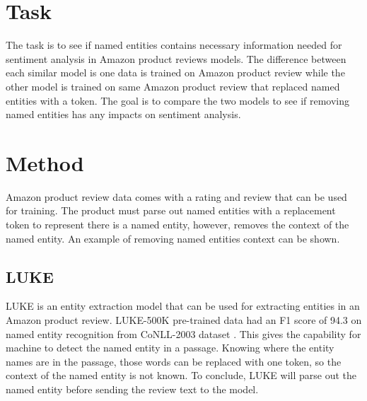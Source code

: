\documentclass[11pt,a4paper]{article}
\begin{document}
\section{Task}

The task is to see if named entities contains necessary information needed for sentiment analysis in Amazon product reviews models. The difference between each similar model is one data is trained on Amazon product review while the other model is trained on same Amazon product review that replaced named entities with a token. The goal is to compare the two models to see if removing named entities has any impacts on sentiment analysis.

\section{Method}

Amazon product review data comes with a rating and review that can be used for training. The product must parse out named entities with a replacement token to represent there is a named entity, however, removes the context of the named entity. An example of removing named entities context can be shown.



\subsection{LUKE}

LUKE is an entity extraction model that can be used for extracting entities in an Amazon product review. LUKE-500K pre-trained data had an F1 score of 94.3 on named entity recognition from CoNLL-2003 dataset \cite{yamada-etal-2020-luke}. This gives the capability for machine to detect the named entity in a passage. Knowing where the entity names are in the passage, those words can be replaced with one token, so the context of the named entity is not known. To conclude, LUKE will parse out the named entity before sending the review text to the model.
\end{document}
